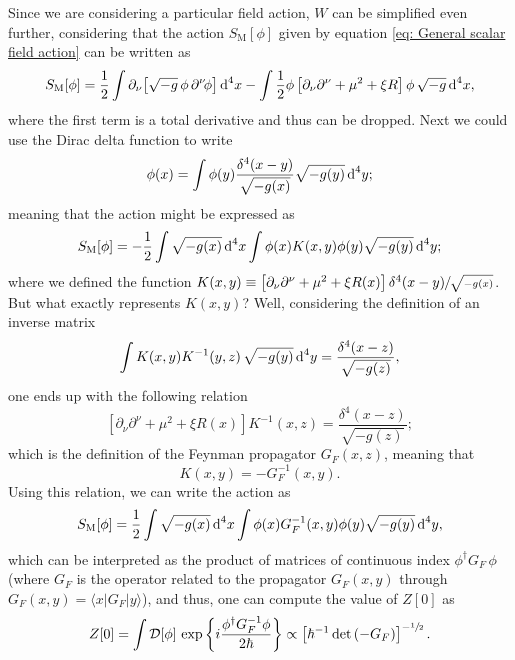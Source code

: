 Since we are considering a particular field action, $W$ can be simplified even further, considering that the action $S_\text{M}[\phi]$ given by equation \ref{eq: General scalar field action} can be written as
\begin{equation}
	S_\text{M}[\phi]=\frac{1}{2}\int\partial_\nu\!\left[\sqrt{-g}\,\phi\,\partial^\nu\!\phi\right]\text{d}^4x-\int\frac{1}{2}\phi\left[\partial_\nu\partial^\nu+\mu^2+\xi R\right]\phi\,\sqrt{-g}\,\text{d}^4x,
\end{equation}
where the first term is a total derivative and thus can be dropped. Next we could use the Dirac delta function to write
\begin{equation}
	\phi(x)=\int\phi(y)\frac{\delta^4(x-y)}{\sqrt{-g(x)}}\sqrt{-g(y)}\,\text{d}^4 y;
\end{equation}
meaning that the action might be expressed as
\begin{equation}
	S_\text{M}[\phi]=-\frac{1}{2}\int\sqrt{-g(x)}\,\text{d}^4x\int\phi(x)K(x,y)\phi(y)\sqrt{-g(y)}\,\text{d}^4 y;
\end{equation}
where we defined the function
$K(x,y)\equiv \left[\partial_\nu\partial^\nu+\mu^2+\xi R(x)\right]\delta^4(x-y)\sfrac{}{\sqrt{-g(x)}}$. But what exactly represents $K(x,y)$? Well, considering the definition of an inverse matrix
\begin{equation}
	\int K(x,y)K^{-1}(y,z)\,\sqrt{-g(y)}\,\text{d}^4y=\frac{\delta^4(x-z)}{\sqrt{-g(z)}},
\end{equation}
one ends up with the following relation
\begin{equation}
	\left[\partial_\nu\partial^\nu+\mu^2+\xi R(x)\right]K^{-1}(x,z)=\frac{\delta^4(x-z)}{\sqrt{-g(z)}};
\end{equation}
which is the definition of the Feynman propagator $G_F(x,z)$, meaning that
\begin{equation}
	K(x,y)=-G_F^{-1}(x,y).
\end{equation}
Using this relation, we can write the action as
\begin{equation}
	S_\text{M}[\phi]=\frac{1}{2}\int\sqrt{-g(x)}\,\text{d}^4x\int\phi(x)G_F^{-1}(x,y)\phi(y)\sqrt{-g(y)}\,\text{d}^4 y,
\end{equation}
which can be interpreted as the product of matrices of continuous index $\phi^\dagger G_F\,\phi$ (where $G_F$ is the operator related to the propagator $G_F(x,y)$ through $G_F(x,y)=\langle x|G_F|y\rangle$), and thus, one can compute the value of $Z[0]$ as
\begin{equation}
	Z[0]=\int\mathcal{D}[\phi]\,\exp{\left\{i\frac{\phi^\dagger G_F^{-1}\phi}{2\hbar}\right\}}\propto\left[\hbar^{-1}\,\text{det}\left(-G_F\right)\right]^{-\sfrac{1}{2}}.
\end{equation}

